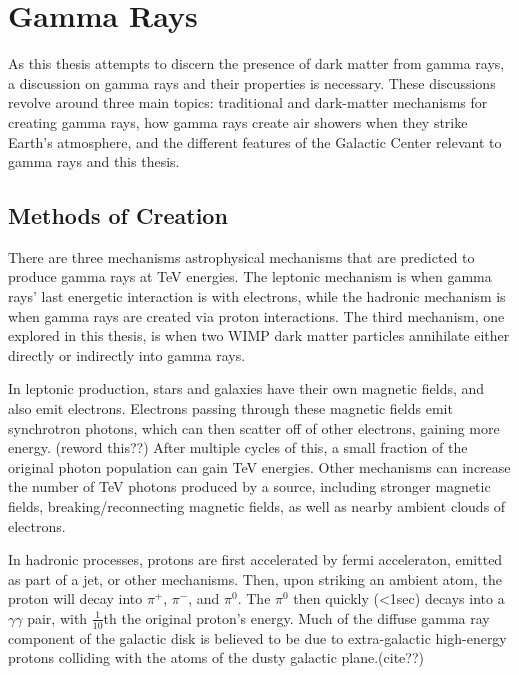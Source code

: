 \cleartooddpage[\thispagestyle{empty}]
\chapter{Gamma Rays}

As this thesis attempts to discern the presence of dark matter from gamma rays, a discussion on gamma rays and their properties is necessary.
These discussions revolve around three main topics: traditional and dark-matter mechanisms for creating gamma rays, how gamma rays create air showers when they strike Earth's atmosphere, and the different features of the Galactic Center relevant to gamma rays and this thesis.


\section{Methods of Creation}

There are three mechanisms astrophysical mechanisms that are predicted to produce gamma rays at TeV energies.
The leptonic mechanism is when gamma rays' last energetic interaction is with electrons, while the hadronic mechanism is when gamma rays are created via proton interactions.
The third mechanism, one explored in this thesis, is when two WIMP dark matter particles annihilate either directly or indirectly into gamma rays.

In leptonic production, stars and galaxies have their own magnetic fields, and also emit electrons.
Electrons passing through these magnetic fields emit synchrotron photons, which can then scatter off of other electrons, gaining more energy. (reword this??)
After multiple cycles of this, a small fraction of the original photon population can gain TeV energies.
Other mechanisms can increase the number of TeV photons produced by a source, including stronger magnetic fields, breaking/reconnecting magnetic fields, as well as nearby ambient clouds of electrons.

In hadronic processes, protons are first accelerated by fermi acceleraton, emitted as part of a jet, or other mechanisms.
Then, upon striking an ambient atom, the proton will decay into $\pi^{+}$, $\pi^{-}$, and $\pi^{0}$.
The $\pi^{0}$ then quickly (<1sec) decays into a $\gamma\gamma$ pair, with \nicetilde $\frac{1}{10}$th the original proton's energy.
Much of the diffuse gamma ray component of the galactic disk is believed to be due to extra-galactic high-energy protons colliding with the atoms of the dusty galactic plane.(cite??)


